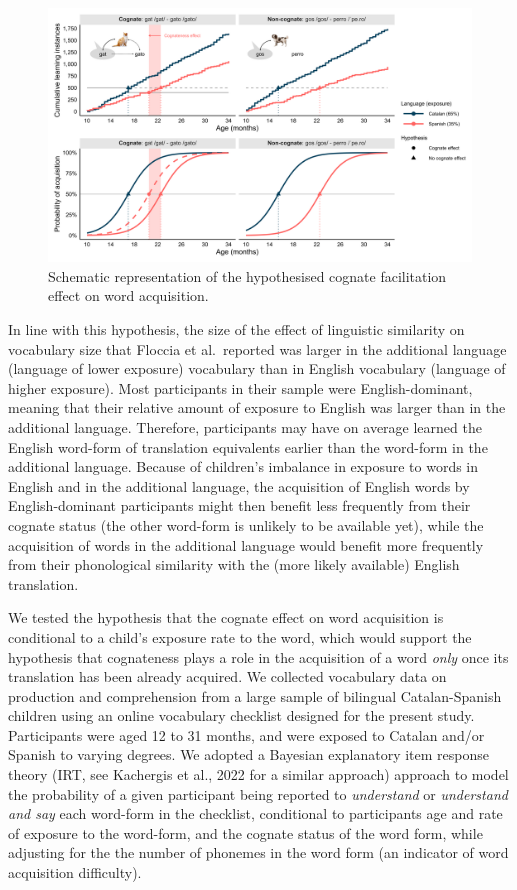 \documentclass[
  man,
  floatsintext,
  colorlinks=true,linkcolor=blue,citecolor=blue,urlcolor=blue,biblatex]{apa7}
\begin{document}
\begin{figure}[h!]
\caption{Schematic representation of the hypothesised cognate facilitation effect on word acquisition.}
\label{apafg-hypotheses}
\includegraphics[width=1\linewidth]{assets/img/diagram.png}

\end{figure}

In line with this hypothesis, the size of the effect of linguistic
similarity on vocabulary size that Floccia et al.~reported was larger in
the additional language (language of lower exposure) vocabulary than in
English vocabulary (language of higher exposure). Most participants in
their sample were English-dominant, meaning that their relative amount
of exposure to English was larger than in the additional language.
Therefore, participants may have on average learned the English
word-form of translation equivalents earlier than the word-form in the
additional language. Because of children's imbalance in exposure to
words in English and in the additional language, the acquisition of
English words by English-dominant participants might then benefit less
frequently from their cognate status (the other word-form is unlikely to
be available yet), while the acquisition of words in the additional
language would benefit more frequently from their phonological
similarity with the (more likely available) English translation.

We tested the hypothesis that the cognate effect on word acquisition is
conditional to a child's exposure rate to the word, which would support
the hypothesis that cognateness plays a role in the acquisition of a
word \emph{only} once its translation has been already acquired. We
collected vocabulary data on production and comprehension from a large
sample of bilingual Catalan-Spanish children using an online vocabulary
checklist designed for the present study. Participants were aged 12 to
31 months, and were exposed to Catalan and/or Spanish to varying
degrees. We adopted a Bayesian explanatory item response theory (IRT,
see Kachergis et al., 2022 for a similar approach) approach to model the
probability of a given participant being reported to \emph{understand}
or \emph{understand and say} each word-form in the checklist,
conditional to participants age and rate of exposure to the word-form,
and the cognate status of the word form, while adjusting for the the
number of phonemes in the word form (an indicator of word acquisition
difficulty).
\end{document}
